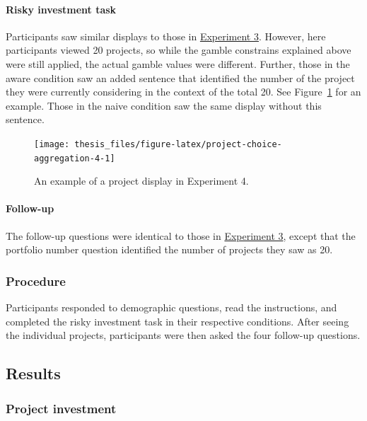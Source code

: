 \documentclass[a4paper, nobind, dvipsnames]{templates/ociamthesis}
\theoremstyle{definition}
\theoremstyle{definition}
\theoremstyle{definition}
\theoremstyle{definition}
\theoremstyle{remark}
\begin{document}
\paragraph{Risky investment task}

Participants saw similar displays to those in
\protect\hyperlink{task-aggregation-3}{Experiment 3}. However, here participants viewed 20
projects, so while the gamble constrains explained above were still applied, the
actual gamble values were different. Further, those in the aware condition saw
an added sentence that identified the number of the project they were currently
considering in the context of the total 20. See
Figure~\ref{fig:project-choice-aggregation-4} for an example. Those in the
naive condition saw the same display without this sentence.



\begin{figure}
\texttt{[image: thesis\_files/figure-latex/project-choice-aggregation-4-1]} \caption{An example of a project display in Experiment 4.}\label{fig:project-choice-aggregation-4}
\end{figure}

\paragraph{Follow-up}

The follow-up questions were identical to those in
\protect\hyperlink{follow-up-aggregation-3}{Experiment 3}, except that the portfolio number
question identified the number of projects they saw as 20.

\subsubsection{Procedure}

Participants responded to demographic questions, read the instructions, and
completed the risky investment task in their respective conditions. After seeing
the individual projects, participants were then asked the four follow-up
questions.

\subsection{Results}

\subsubsection{Project investment}
\end{document}
